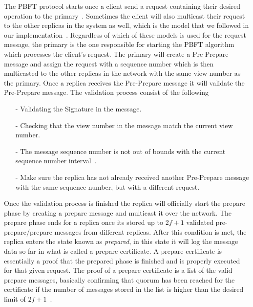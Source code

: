 The PBFT protocol starts once a client send a request containing their desired operation to the primary~\cite[p.~4]{PAPER:OGPBFT}. Sometimes the client will also multicast their request to the other replicas in the system as well, which is the model that we followed in our implementation~\cites[p.~2]{PAPER:DPBFT}[p.~406]{PAPER:PBFTRecovery}[p.~258]{BOOK:BuildDepDistSyst}. Regardless of which of these models is used for the request message, the primary is the one responsible for starting the PBFT algorithm which processes the client's request. The primary will create a Pre-Prepare message and assign the request with a sequence number which is then multicasted to the other replicas in the network with the same view number as the primary. Once a replica receives the Pre-Prepare message it will validate the Pre-Prepare message. The validation process consist of the following~\cites[p.~4]{PAPER:OGPBFT} {SLIDES:PBFT}[p.~259]{BOOK:BuildDepDistSyst}
\begin{itemize}
	\item[-]Validating the Signature in the message.
	\item[-]Checking that the view number in the message match the current view number.
	\item[-]The message sequence number is not out of bounds with the current sequence number interval~\cites{SLIDES:PBFT}[p.~4]{PAPER:OGPBFT}.
	\item[-]Make sure the replica has not already received another Pre-Prepare message with the same sequence number, but with a different request.
\end{itemize} 
Once the validation process is finished the replica will officially start the prepare phase by creating a prepare message and multicast it over the network. The prepare phase ends for a replica once its stored up to $2f+1$ validated pre-prepare/prepare messages from different replicas. After this condition is met, the replica enters the state known as \emph{prepared}, in this state it will log the message data so far in what is called a prepare certificate. A prepare certificate is essentially a proof that the prepared phase is finished and is properly executed for that given request. The proof of a prepare certificate is a list of the valid prepare messages, basically confirming that quorum has been reached for the certificate if the number of messages stored in the list is higher than the desired limit of $2f + 1$~\cites[p.~408]{PAPER:PBFTRecovery}[p.~457]{BOOK:MVstandver3}. 
